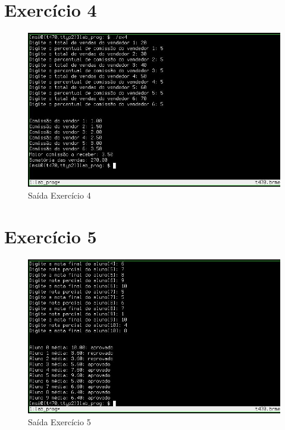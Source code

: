 \documentclass[12pt,a4paper]{article}
\let\oldsection\section
\renewcommand\section{\clearpage\oldsection}
\begin{document}
\section{Exercício 4}

\begin{figure}[htb!]
	\centering
	\includegraphics[width=16cm]{ex4}
	\caption{Saída Exercício 4}
	\label{fig:4}
\end{figure}

\section{Exercício 5}

\begin{figure}[htb!]
	\centering
	\includegraphics[width=16cm]{ex5}
	\caption{Saída Exercício 5}
	\label{fig:5}
\end{figure}
\end{document}
